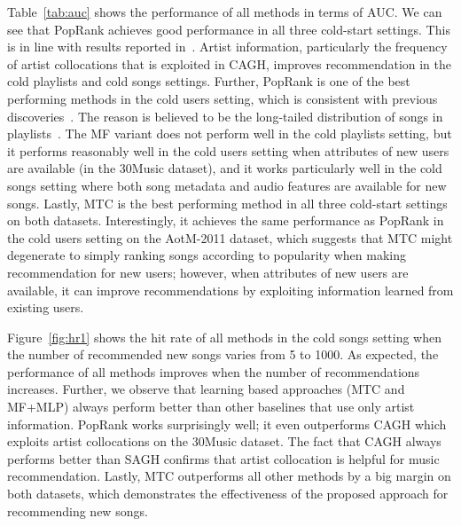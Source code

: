 Table~\ref{tab:auc} shows the performance of all methods in terms of AUC.
We can see that PopRank %
achieves good performance in all three cold-start settings.
This is in line with results reported in~\cite{bonnin2013evaluating,bonnin2015automated}.
Artist information, particularly the frequency of artist collocations that is exploited in CAGH, 
improves recommendation in the cold playlists and cold songs settings.
Further, PopRank is one of the best performing methods in the cold users setting,
which is consistent with previous discoveries~\cite{mcfee2012million,bonnin2013evaluating,bonnin2015automated}.
The reason is believed to be the long-tailed distribution of songs in
playlists~\cite{cremonesi2010performance,bonnin2013evaluating}.
The MF variant does not perform well in the cold playlists setting,
but it performs reasonably well in the cold users setting when attributes of new users are available
(\eg in the 30Music dataset),
and it works particularly well in the cold songs setting where both song metadata and audio features are available 
for new songs.
Lastly, MTC is the best performing method in all three cold-start settings on both datasets.
Interestingly, it achieves the same performance as PopRank in the cold users setting on the AotM-2011 dataset,
which suggests that MTC might degenerate to simply ranking songs according to popularity when making recommendation
for new users; however, when attributes of new users are available, %
it can improve recommendations by exploiting information learned from existing users.


Figure~\ref{fig:hr1} shows the hit rate of all methods in the cold songs setting
when the number of recommended new songs varies from 5 to 1000.
As expected, the performance of all methods improves when the number of recommendations increases.
Further, we observe that learning based approaches (\ie MTC and MF+MLP) always perform better than 
other baselines that use only artist information.
PopRank %
works surprisingly well;
it even outperforms CAGH which exploits artist collocations on the 30Music dataset.
The fact that CAGH always performs better than SAGH confirms that artist collocation is helpful
for music recommendation.
Lastly, MTC outperforms all other methods by a big margin on both datasets,
which demonstrates the effectiveness of the proposed approach for recommending new songs.

